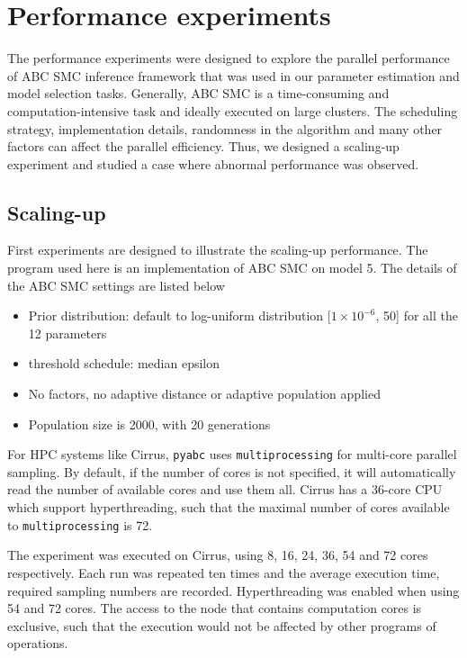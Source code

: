 \chapter{Performance experiments}

The performance experiments were designed to explore the parallel performance of ABC SMC inference framework that was used in our parameter estimation and model selection tasks. Generally, ABC SMC is a time-consuming and computation-intensive task and ideally executed on large clusters. The scheduling strategy, implementation details, randomness in the algorithm and many other factors can affect the parallel efficiency. Thus, we designed a scaling-up experiment and studied a case where abnormal performance was observed.


\section{Scaling-up}

First experiments are designed to illustrate the scaling-up performance. The program used here is an implementation of ABC SMC on model 5. The details of the ABC SMC settings are listed below

\begin{itemize}
    \item Prior distribution: default to log-uniform distribution [$1\times 10^{-6}$, 50] for all the 12 parameters
    \item threshold schedule: median epsilon
    \item No factors, no adaptive distance or adaptive population applied
    \item Population size is 2000, with 20 generations
\end{itemize}


For HPC systems like Cirrus, \verb|pyabc| uses \verb|multiprocessing| for multi-core parallel sampling. By default, if the number of cores is not specified, it will automatically read the number of available cores and use them all. Cirrus has a 36-core CPU which support hyperthreading, such that the maximal number of cores available to \verb|multiprocessing| is 72.

The experiment was executed on Cirrus, using 8, 16, 24, 36, 54 and 72 cores respectively. Each run was repeated ten times and the average execution time, required sampling numbers are recorded. Hyperthreading was enabled when using 54 and 72 cores. The access to the node that contains computation cores is exclusive, such that the execution would not be affected by other programs of operations.

